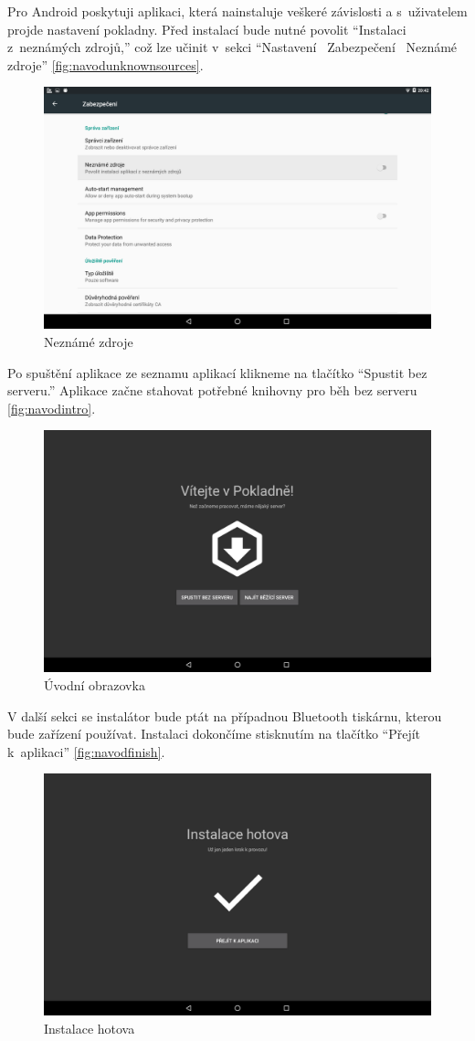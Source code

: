 \documentclass[a4paper,11pt,oneside]{article}
\begin{document}
Pro Android poskytuji aplikaci, která nainstaluje veškeré závislosti a s~uživatelem projde nastavení pokladny. Před instalací bude nutné povolit \enquote{Instalaci z~neznámých zdrojů,} což lze učinit v~sekci \enquote{Nastavení \textrightarrow~Zabezpečení \textrightarrow~Neznámé zdroje} \eqref{fig:navodunknownsources}.

\begin{figure}[H]
	\centering
	\includegraphics[width=0.6\linewidth]{../navod_unknown_sources}
	\caption{Neznámé zdroje}
	\label{fig:navodunknownsources}
\end{figure}

Po spuštění aplikace ze seznamu aplikací klikneme na tlačítko \enquote{Spustit bez serveru.} Aplikace začne stahovat potřebné knihovny pro běh bez serveru \eqref{fig:navodintro}.

\begin{figure}[H]
	\centering
	\includegraphics[width=0.6\linewidth]{../navod_intro}
	\caption{Úvodní obrazovka}
	\label{fig:navodintro}
\end{figure}

V další sekci se instalátor bude ptát na případnou Bluetooth tiskárnu, kterou bude zařízení používat. Instalaci dokončíme stisknutím na tlačítko \enquote{Přejít k~aplikaci} \eqref{fig:navodfinish}.

\begin{figure}[H]
	\centering
	\includegraphics[width=0.6\linewidth]{../navod_finish}
	\caption{Instalace hotova}
	\label{fig:navodfinish}
\end{figure}
\end{document}
